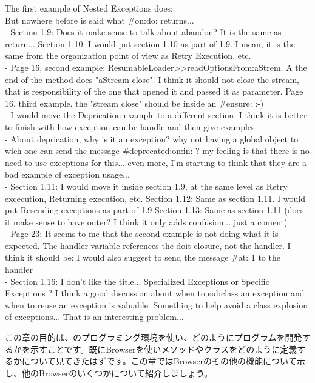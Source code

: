 \documentclass[a4paper,10pt,twoside]{book}
\begin{document}
{The first example of Nested Exceptions does:
\ct{result := [[ Error signal ....]}\\
But nowhere before is said what \#on:do: returns...  \\
- Section 1.9: Does it make sense to talk about abandon? It is the same as return... 
Section 1.10: I would put section 1.10 as part of 1.9. I mean, it is the same from the organization point of view as Retry Execution, etc. \\
- Page 16, second example: ResumableLoader>>readOptionsFrom:aStrem. A the end of the method does "aStream close". I think it should not close the stream, that is responsibility of the one that opened it and passed it as parameter.
Page 16, third example, the "stream close" should be inside an \#ensure: :-) \\
- I would move the Deprication example to a different section. I think it is better to finish with how exception can be handle and then give examples. \\
- About deprication, why is it an exception? why not having a global object to wich one can send the message \#deprecated:on:in: ? my feeling is that there is no need to use exceptions for this... even more, I'm starting to think that they are a bad example of exception usage... \\
- Section 1.11: I would move it inside section 1.9, at the same level as Retry excecution, Returning execution, etc.
Section 1.12: Same as section 1.11. I would put Resending exceptions as part of 1.9
Section 1.13: Same as section 1.11 (does it make sense to have outer? I think it only adds confusion... just a coment) \\
- Page 23: It seems to me that the second example is not doing what it is expected. The handler variable references the doit closure, not the handler. I think it should be:
I would also suggest to send the message \#at: 1 to the handler \\
- Section 1.16: I don't like the title... Specialized Exceptions or Specific Exceptions ?
I think a good discussion about when to subclass an exception and when to reuse an exception is valuable. Something to help avoid a class explosion of exceptions... That is an interesting problem... \\
}

この章の目的は、\pharo のプログラミング環境を使い、どのようにプログラムを開発するかを示すことです。既にBrowserを使いメソッドやクラスをどのように定義するかについて見てきたはずです。この章ではBrowserのその他の機能について示し、他のBrowserのいくつかについて紹介しましょう。
\end{document}
